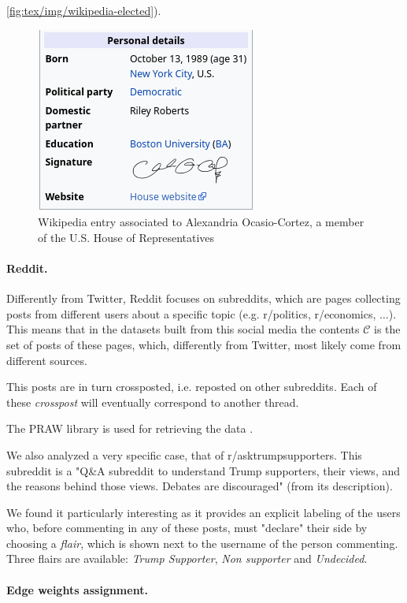 \autoref{fig:tex/img/wikipedia-elected}).
\begin{figure}
	\centering
	\includegraphics[width=0.4\linewidth]{tex/img/wikipedia-elected.png}
	\caption[Example Wikipedia entry]{Wikipedia entry associated to Alexandria Ocasio-Cortez, a member
		of the U.S. House of Representatives}%
	\label{fig:tex/img/wikipedia-elected}
\end{figure}

\paragraph{Reddit.}%
\label{par:reddit}

Differently from Twitter, Reddit focuses on subreddits, which are pages
collecting posts from different users about a specific topic (e.g. r/politics,
r/economics, $\dots$). This means that
in the datasets built from this social media the contents $\mathcal{C} $ is the
set of posts of these pages, which, differently from Twitter, most likely
come from different sources.

This posts are in turn crossposted, i.e. reposted on other subreddits. Each of
these \emph{crosspost} will eventually correspond to another thread.

The PRAW library is used for retrieving the data \cite{praw}.

We also analyzed a
very specific case, that of r/asktrumpsupporters. This subreddit is a "Q\&A
subreddit to understand Trump supporters, their views, and the reasons behind
those views. Debates are discouraged" (from its description).

We found it particularly interesting as it provides an explicit labeling of the
users who, before commenting in any of these posts, must "declare" their side
by choosing a \emph{flair}, which is shown next to the username of the person
commenting.  Three flairs are available: \emph{Trump Supporter}, \emph{Non
	supporter} and \emph{Undecided}.

\paragraph{Edge weights assignment.}%
\label{par:assigning_edge_weights}

